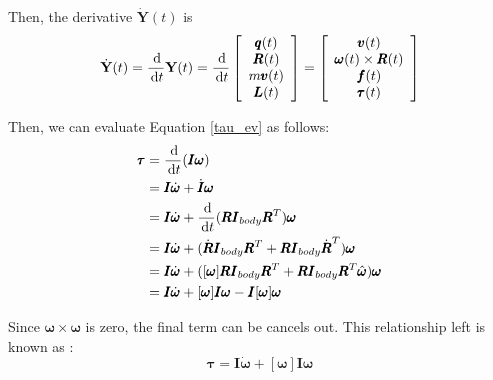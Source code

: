 Then, the derivative $\dot{\textbf{Y}}(t)$ is
\begin{equation}
    \dot{\textbf{Y}}(t) = \frac{\,\mathrm{d}}{\,\mathrm{d}{t}}\textbf{Y}(t) = \frac{\,\mathrm{d}}{\,\mathrm{d} t}\left[
        \begin{array}{c}
            \pmb{q}(t) \\
            \pmb{R}(t) \\
            m \pmb{v}(t) \\
            \pmb{L}(t) \\
        \end{array}
    \right] = \left[
        \begin{array}{c}
            \pmb{v}(t) \\
            \pmb{\omega}(t)\times\pmb{R}(t) \\
            \pmb{f}(t) \\
            \pmb{\tau}(t) \\
        \end{array}
    \right]
\end{equation}

Then, we can evaluate Equation \ref{tau_ev} as follows:
\begin{equation}
    \begin{aligned}
        \pmb{\tau} &= \frac{\,\mathrm{d}}{\,\mathrm{d} t}(\pmb{I}\pmb{\omega}) \\
        &= \pmb{I}\dot{\pmb{\omega}} + \dot{\pmb{I}}\pmb{\omega} \\
        &= \pmb{I}\dot{\pmb{\omega}} + \frac{\,\mathrm{d}}{\,\mathrm{d} t}(\pmb{R}\pmb{I}_{body}\pmb{R}^{T})\pmb{\omega} \\
        &= \pmb{I}\dot{\pmb{\omega}} + (\dot{\pmb{R}}\pmb{I}_{body}\pmb{R}^{T} + \pmb{R}\pmb{I}_{body}\dot{\pmb{R}}^{T})\pmb{\omega} \\
        &= \pmb{I}\dot{\pmb{\omega}} + ([\pmb{\omega}]\pmb{R}\pmb{I}_{body}\pmb{R}^{T} + \pmb{R}\pmb{I}_{body}\pmb{R}^{T} \hat{\pmb{\omega}})\pmb{\omega} \\
        &= \pmb{I}\dot{\pmb{\omega}} + [\pmb{\omega}]\pmb{I}\pmb{\omega} - \pmb{I}[\pmb{\omega}]\pmb{\omega}
    \end{aligned}
    \label{tau_ev}
\end{equation}

Since $\pmb{\omega} \times \pmb{\omega}$ is zero, the final term can be cancels out. This relationship left is known as :
\begin{equation}
    \pmb{\tau} = \pmb{I}\dot{\pmb{\omega}} + [\pmb{\omega}]\pmb{I}\pmb{\omega}
    \label{tau}
\end{equation}

